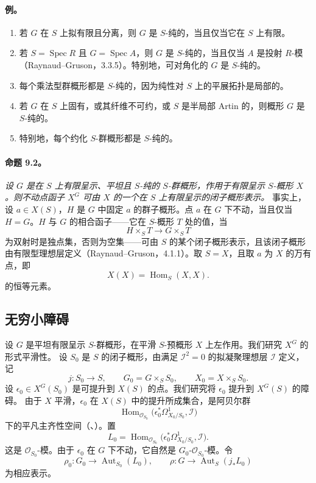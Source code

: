 \paragraph{\textbf{例。}}
\begin{enumerate}
\item[\textup{(1)}] 若 \(G\) 在 \(S\) 上拟有限且分离，则 \(G\) 是 \(S\)-纯的，当且仅当它在 \(S\) 上有限。
\item[\textup{(2)}] 若 \(S=\operatorname{Spec}R\) 且 \(G=\operatorname{Spec}A\)，则 \(G\) 是 \(S\)-纯的，当且仅当 \(A\) 是投射 \(R\)-模（Raynaud--Gruson，3.3.5）。特别地，可对角化的 \(G\) 是 \(S\)-纯的。
\item[\textup{(3)}] 每个乘法型群概形都是 \(S\)-纯的，因为纯性对 \(S\) 上的平展拓扑是局部的。
\item[\textup{(4)}] 若 \(G\) 在 \(S\) 上固有，或其纤维不可约，或 \(S\) 是半局部 Artin 的，则概形 \(G\) 是 \(S\)-纯的。
\item[\textup{(5)}] 特别地，每个约化 \(S\)-群概形都是 \(S\)-纯的。
\end{enumerate}
\paragraph{\textbf{命题 9.2。}}
\emph{设 \(G\) 是在 \(S\) 上有限呈示、平坦且 \(S\)-纯的 \(S\)-群概形，作用于有限呈示 \(S\)-概形 \(X\)。则不动点函子 \(X^G\) 可由 \(X\) 的一个在 \(S\) 上有限呈示的闭子概形表示。}
事实上，设 \(a\in X(S)\)，\(H\) 是 \(G\) 中固定 \(a\) 的群子概形。点 \(a\) 在 \(G\) 下不动，当且仅当 \(H=G\)。\(H\) 与 \(G\) 的相合函子——它在 \(S\)-概形 \(T\) 处的值，当
\[
  H\times_S T\longrightarrow G\times_S T
\]
为双射时是独点集，否则为空集——可由 \(S\) 的某个闭子概形表示，且该闭子概形由有限型理想层定义（Raynaud--Gruson，4.1.1）。取 \(S=X\)，且取 \(a\) 为 \(X\) 的万有点，即
\[
  X(X)=\operatorname{Hom}_S(X,X).
\]
的恒等元素。
\setcounter{subsection}{2}
\subsection{无穷小障碍}
设 \(G\) 是平坦有限呈示 \(S\)-群概形，在平滑 \(S\)-预概形 \(X\) 上左作用。我们研究 \(X^G\) 的形式平滑性。
设 \(S_0\) 是 \(S\) 的闭子概形，由满足 \(\mathcal I^2=0\) 的拟凝聚理想层 \(\mathcal I\) 定义，记
\[
  j:S_0\longrightarrow S,\qquad
  G_0=G\times_S S_0,\qquad
  X_0=X\times_S S_0.
\]
设 \(\epsilon_0\in X^G(S_0)\) 是可提升到 \(X(S)\) 的点。我们研究将 \(\epsilon_0\) 提升到 \(X^G(S)\) 的障碍。
由于 \(X\) 平滑，\(\epsilon_0\) 在 \(X(S)\) 中的提升所成集合，是阿贝尔群
\[
  \operatorname{Hom}_{\mathcal O_{S_0}}
  \bigl(\epsilon_0^*\Omega^1_{X_0/S_0},\mathcal I\bigr)
\]
下的平凡主齐性空间（、）。置
\[
  L_0=
  \operatorname{Hom}_{\mathcal O_{S_0}}
  \bigl(\epsilon_0^*\Omega^1_{X_0/S_0},\mathcal I\bigr).
\]
这是 \(\mathcal O_{S_0}\)-模。由于 \(\epsilon_0\) 在 \(G\) 下不动，它自然是 \(G_0\)-\(\mathcal O_{S_0}\)-模。令
\[
  \rho_0:G_0\longrightarrow\operatorname{Aut}_{S_0}(L_0),
  \qquad
  \rho:G\longrightarrow\operatorname{Aut}_S(j_*L_0)
\]
为相应表示。
